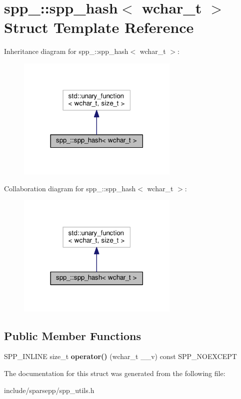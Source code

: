 \hypertarget{structspp___1_1spp__hash_3_01wchar__t_01_4}{}\section{spp\+\_\+\+:\+:spp\+\_\+hash$<$ wchar\+\_\+t $>$ Struct Template Reference}
\label{structspp___1_1spp__hash_3_01wchar__t_01_4}


Inheritance diagram for spp\+\_\+\+:\+:spp\+\_\+hash$<$ wchar\+\_\+t $>$\+:\nopagebreak
\begin{figure}[H]
\begin{center}
\leavevmode
\includegraphics[width=218pt]{structspp___1_1spp__hash_3_01wchar__t_01_4__inherit__graph}
\end{center}
\end{figure}


Collaboration diagram for spp\+\_\+\+:\+:spp\+\_\+hash$<$ wchar\+\_\+t $>$\+:\nopagebreak
\begin{figure}[H]
\begin{center}
\leavevmode
\includegraphics[width=218pt]{structspp___1_1spp__hash_3_01wchar__t_01_4__coll__graph}
\end{center}
\end{figure}
\subsection*{Public Member Functions}
\begin{DoxyCompactItemize}
\item 
S\+P\+P\+\_\+\+I\+N\+L\+I\+NE size\+\_\+t {\bfseries operator()} (wchar\+\_\+t \+\_\+\+\_\+v) const S\+P\+P\+\_\+\+N\+O\+E\+X\+C\+E\+PT\hypertarget{structspp___1_1spp__hash_3_01wchar__t_01_4_a09473a4d94c8df60f4d1d899195e05f3}{}\label{structspp___1_1spp__hash_3_01wchar__t_01_4_a09473a4d94c8df60f4d1d899195e05f3}

\end{DoxyCompactItemize}


The documentation for this struct was generated from the following file\+:\begin{DoxyCompactItemize}
\item 
include/sparsepp/spp\+\_\+utils.\+h\end{DoxyCompactItemize}
